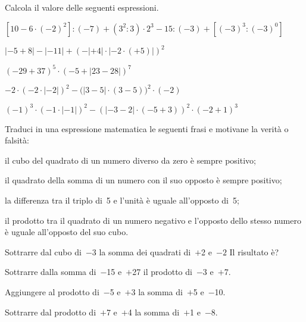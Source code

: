 \begin{esercizio}[\Ast]
Calcola il valore delle seguenti espressioni.
 \begin{enumeratea}
 \item $[10-6\cdot(-2)^2]:(-7)+(3^2:3)\cdot2^3-15:(-3)+[(-3)^3:(-3)^0]$
 \item $|-5+8|-|-11|+(-|+4|\cdot|-2\cdot(+5)|)^2$
 \item $(-29+37)^5\cdot(-5+|23-28|)^7$
 \item $-2\cdot(-2\cdot|-2|)^2-\big(|3-5|\cdot(3-5)\big)^2\cdot(-2)$
 \item $(-1)^3\cdot(-1\cdot|-1|)^2-(|-3-2|\cdot(-5+3))^2\cdot(-2+1)^3$
 \end{enumeratea}
\end{esercizio}
\begin{multicols}{2}
\begin{esercizio}
Traduci in una espressione matematica le seguenti frasi e motivane la verità o 
falsità:
 \begin{enumeratea}
 \item il cubo del quadrato di un numero diverso da zero è sempre positivo;
 \item il quadrato della somma di un numero con il suo opposto è sempre 
positivo;
 \item la differenza tra il triplo di~5 e l'unità è uguale all'opposto di~5;
 \item il prodotto tra il quadrato di un numero negativo e l'opposto dello 
stesso numero 
è uguale all'opposto del suo cubo.
 \end{enumeratea}
\end{esercizio}

\begin{esercizio}
 Sottrarre dal cubo di~$-3$ la somma dei quadrati di~$+$2 e~$-2$ Il risultato è?
\end{esercizio}

\begin{esercizio}
 Sottrarre dalla somma di~$-$15 e~$+$27 il prodotto di~$-$3 e~$+$7.
\end{esercizio}

\begin{esercizio}
 Aggiungere al prodotto di~$-$5 e~$+$3 la somma di~$+$5 e~$-$10.
\end{esercizio}

\begin{esercizio}
 Sottrarre dal prodotto di~$+$7 e~$+$4 la somma di~$+$1 e~$-$8.
\end{esercizio}


\end{multicols}
